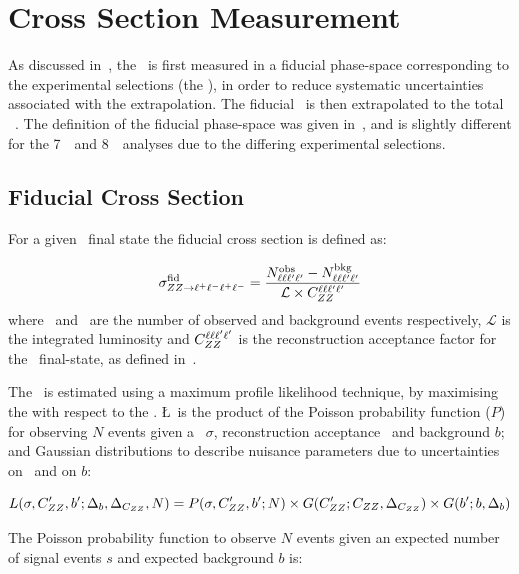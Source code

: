 \section{Cross Section Measurement}

As discussed in~, the \cx\ is first measured in a fiducial phase-space
corresponding to the experimental selections (the ), in
order to reduce systematic uncertainties associated with the extrapolation. The
fiducial \cx\ is then extrapolated to the total \ZZ\ \cx. The definition of the
fiducial phase-space was given in~, and is slightly different for the
7~\tev\ and 8~\tev\ analyses due to the differing experimental selections.

\subsection{Fiducial Cross Section}

For a given \ZZllll\ final state the fiducial cross section is defined as:

\begin{equation}\label{eq:xsecfid_fourl}
\sigma_{ZZ\rightarrow\ell^{+}\ell^{-}\ell^{+}\ell^{-}}^{\rm fid} = \frac{N^{\rm obs}_{\ell\ell\ell'\ell'} - N^{\rm bkg}_{\ell\ell\ell'\ell'}}{\mathcal{L} \times C_{ZZ}^{\ell\ell\ell'\ell'}}
\end{equation}
where \NObs\ and \NBg\ are the number of observed and
background events respectively, $\mathcal{L}$ is the integrated luminosity and
$C_{ZZ}^{\ell\ell\ell'\ell'}$ is the reconstruction acceptance factor for the \lllplp\
final-state, as defined in~.

The \cx\ is estimated using a maximum profile likelihood technique, by
maximising the \intro{profile likelihood function, \L} with respect to the \cx.
\L\ is the product of the Poisson probability function ($P$) for observing $N$ events given a
\cx\ $\sigma$, reconstruction acceptance \CZZ\ and background $b$; and Gaussian
distributions to describe nuisance parameters due to uncertainties on \CZZ\
and on $b$:

\begin{equation}
\small
   L(\sigma, C_{ZZ}', b'; \Delta_{b}, \Delta_{C_{ZZ}}, N) = P(\sigma, C_{ZZ}^\prime,
   b^\prime; N)\times G(C_{ZZ}^\prime; C_{ZZ}, \Delta_{C_{ZZ}}) \times G(b^\prime; b, \Delta_{b})
\end{equation}

The Poisson probability function to observe $N$ events given an expected
number of signal events $s$ and expected background $b$ is:

